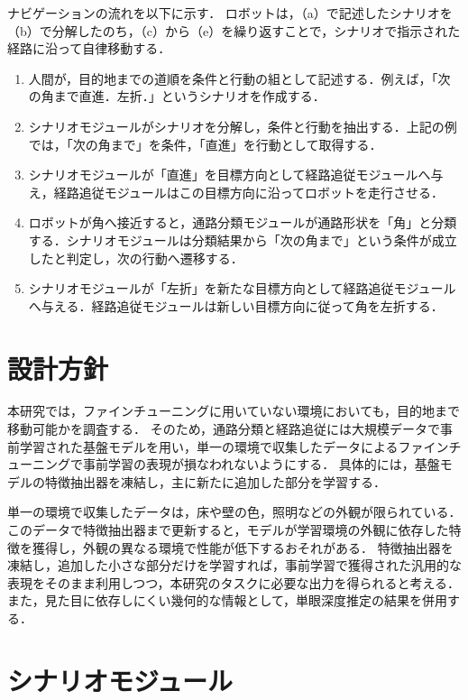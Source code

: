 ナビゲーションの流れを以下に示す．
ロボットは，（a）で記述したシナリオを（b）で分解したのち，（c）から（e）を繰り返すことで，シナリオで指示された経路に沿って自律移動する．
\begin{enumerate}[label=（\alph*）,leftmargin=*,labelsep=0pt]
  \item 人間が，目的地までの道順を条件と行動の組として記述する．例えば，「次の角まで直進．左折．」というシナリオを作成する．
  \item シナリオモジュールがシナリオを分解し，条件と行動を抽出する．上記の例では，「次の角まで」を条件，「直進」を行動として取得する．
  \item シナリオモジュールが「直進」を目標方向として経路追従モジュールへ与え，経路追従モジュールはこの目標方向に沿ってロボットを走行させる．
  \item ロボットが角へ接近すると，通路分類モジュールが通路形状を「角」と分類する．シナリオモジュールは分類結果から「次の角まで」という条件が成立したと判定し，次の行動へ遷移する．
  \item シナリオモジュールが「左折」を新たな目標方向として経路追従モジュールへ与える．経路追従モジュールは新しい目標方向に従って角を左折する．
\end{enumerate}

\section{設計方針}
\label{sec:policy}

本研究では，ファインチューニングに用いていない環境においても，目的地まで移動可能かを調査する．
そのため，通路分類と経路追従には大規模データで事前学習された基盤モデルを用い，単一の環境で収集したデータによるファインチューニングで事前学習の表現が損なわれないようにする．
具体的には，基盤モデルの特徴抽出器を凍結し，主に新たに追加した部分を学習する．

単一の環境で収集したデータは，床や壁の色，照明などの外観が限られている．
このデータで特徴抽出器まで更新すると，モデルが学習環境の外観に依存した特徴を獲得し，外観の異なる環境で性能が低下するおそれがある．
特徴抽出器を凍結し，追加した小さな部分だけを学習すれば，事前学習で獲得された汎用的な表現をそのまま利用しつつ，本研究のタスクに必要な出力を得られると考える．
また，見た目に依存しにくい幾何的な情報として，単眼深度推定の結果を併用する．

\section{シナリオモジュール}
\label{sec:scenario_module}


